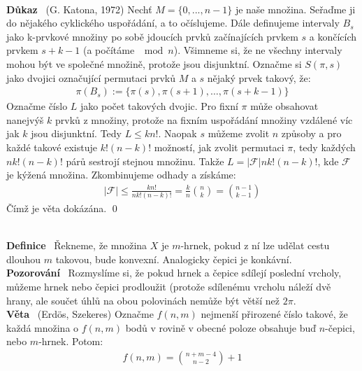 \documentclass{article}
\renewcommand{\paragraph}[1]{\ \\\smallskip\noindent\textbf{#1}\ }
\begin{document}
\paragraph{Důkaz} (G. Katona, 1972) Nechť $M=\{0, ..., n-1\}$ je naše množina.  
Seřaďme ji do nějakého cyklického uspořádání, a to očíslujeme. Dále definujeme 
intervaly $B_s$ jako k-prvkové množiny po sobě jdoucích prvků začínajících 
prvkem $s$ a končících prvkem $s+k-1$ (a počítáme $\mod n$). Všimneme si, že ne 
všechny intervaly mohou být ve společné množině, protože jsou disjunktní.  
Označme si $S(\pi, s)$ jako dvojici označující permutaci prvků $M$ a $s$ nějaký 
prvek takový, že:
\begin{align}
	\pi(B_s) := \{ \pi(s), \pi(s+1), \dots, \pi(s+k-1)\}
\end{align}
Označme číslo $L$ jako počet takových dvojic. Pro fixní $\pi$ může obsahovat 
nanejvýš $k$ prvků z množiny, protože na fixním uspořádání množiny vzdálené víc 
jak $k$ jsou disjunktní. Tedy $L \leq k n!$. Naopak $s$ můžeme zvolit $n$ 
způsoby a pro každé takové existuje $k!(n-k)!$ možností, jak zvolit permutaci 
$\pi$, tedy každých $nk!(n-k)!$ párů sestrojí stejnou množinu. Takže $L = 
|\mathcal{F}| nk!(n-k)!$, kde $\mathcal{F}$ je kýžená množina. Zkombinujeme 
odhady a získáme:
\begin{align}
	|\mathcal F| \leq \frac{kn!}{nk!(n-k)!} = \frac{k}{n}\binom{n}{k} = 
	\binom{n-1}{k-1}
\end{align}
Čímž je věta dokázána. \qed

\paragraph{Definice} Řekneme, že množina $X$ je $m$-hrnek, pokud z ní lze udělat 
cestu dlouhou $m$ takovou, bude konvexní. Analogicky čepici je konkávní.
\paragraph{Pozorování} Rozmyslíme si, že pokud hrnek a čepice sdílejí poslední 
vrcholy, můžeme hrnek nebo čepici prodloužit (protože sdílenému vrcholu náleží 
dvě hrany, ale součet úhlů na obou polovinách nemůže být větší než $2\pi$.
\paragraph{Věta} (Erdös, Szekeres)
Označme $f(n,m)$ nejmenší přirozené číslo takové, že každá množina o $f(n,m)$ 
bodů v rovině v obecné poloze obsahuje buď $n$-čepici, nebo $m$-hrnek. Potom:
\begin{align}
	f(n,m) = \binom{n+m-4}{n-2} + 1
\end{align}
\end{document}
